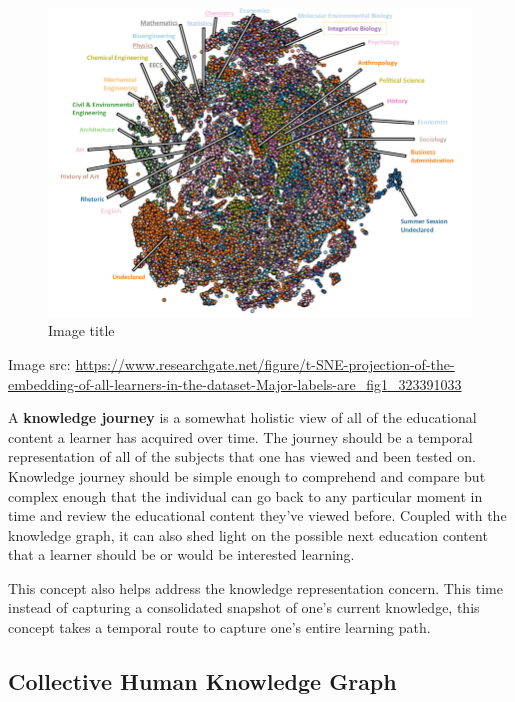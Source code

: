 \documentclass{acm_proc_article-sp}
\begin{document}
\begin{figure}
\centering
\includegraphics{img/tsne.png}
\caption{Image title}
\end{figure}

Image src:
\url{https://www.researchgate.net/figure/t-SNE-projection-of-the-embedding-of-all-learners-in-the-dataset-Major-labels-are_fig1_323391033}

A \textbf{knowledge journey} is a somewhat holistic view of all of the
educational content a learner has acquired over time. The journey should
be a temporal representation of all of the subjects that one has viewed
and been tested on. Knowledge journey should be simple enough to
comprehend and compare but complex enough that the individual can go
back to any particular moment in time and review the educational content
they've viewed before. Coupled with the knowledge graph, it can also
shed light on the possible next education content that a learner should
be or would be interested learning.

This concept also helps address the knowledge representation concern.
This time instead of capturing a consolidated snapshot of one's current
knowledge, this concept takes a temporal route to capture one's entire
learning path.

\subsection{Collective Human Knowledge
Graph}\label{collective-human-knowledge-graph}
\end{document}
